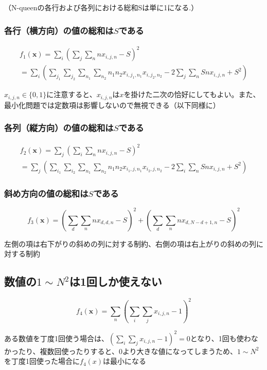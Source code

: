 \documentclass[uplatex,dvipdfmx,a4paper,11pt,oneside,openany]{jsbook}
\begin{document}
（N-queenの各行および各列における総和Sは単に1になる.）

\subsubsection{各行（横方向）の値の総和は$S$である}

\begin{multline}
f_1(\bm{x})=\sum_i\left(\sum_j\sum_n nx_{i,j,n}-S\right)^2\\
=\sum_i\left(\sum_{j_1}\sum_{j_2}\sum_{n_1}\sum_{n_2}n_1 n_2 x_{i,j_1,n_1}x_{i,j_2,n_2} - 2 \sum_j\sum_n S n x_{i,j,n} + S^2\right) \nonumber
\end{multline}

$x_{i,j,n}\in \{0,1\}$に注意すると、$x_{i,j,n}$は$x$を掛けた二次の恰好にしてもよい。また、
最小化問題では定数項は影響しないので無視できる（以下同様に）

\subsubsection{各列（縦方向）の値の総和は$S$である}

\begin{multline}
f_2(\bm{x})=\sum_j\left(\sum_i\sum_n nx_{i,j,n}-S\right)^2\\
=\sum_j\left(\sum_{i_1}\sum_{i_2}\sum_{n_1}\sum_{n_2}n_1 n_2 x_{i_1,j,n_1}x_{i_2,j,n_2} - 2 \sum_i\sum_n S n x_{i,j,n} + S^2\right) \nonumber
\end{multline}

\subsubsection{斜め方向の値の総和は$S$である}

\[
f_3(\bm{x}) = \left(\sum_d\sum_n n x_{d,d,n} - S \right)^2 + \left(\sum_d\sum_n n x_{d,N-d+1,n} - S \right)^2
\]

左側の項は右下がりの斜めの列に対する制約、右側の項は右上がりの斜めの列に対する制約

\subsection{数値の$1\sim N^2$は1回しか使えない}

\[
f_4(\bm{x})=\sum_n\left(\sum_i\sum_j x_{i,j,n} - 1\right)^2
\]

ある数値を丁度1回使う場合は、$\left(\sum_i\sum_j x_{i,j,n} - 1\right)^2=0$となり、1回も使わなかったり、複数回使ったりすると、0より大きな値になってしまうため、$1\sim N^2$を丁度1回使った場合に$f_4(x)$は最小になる
\end{document}
